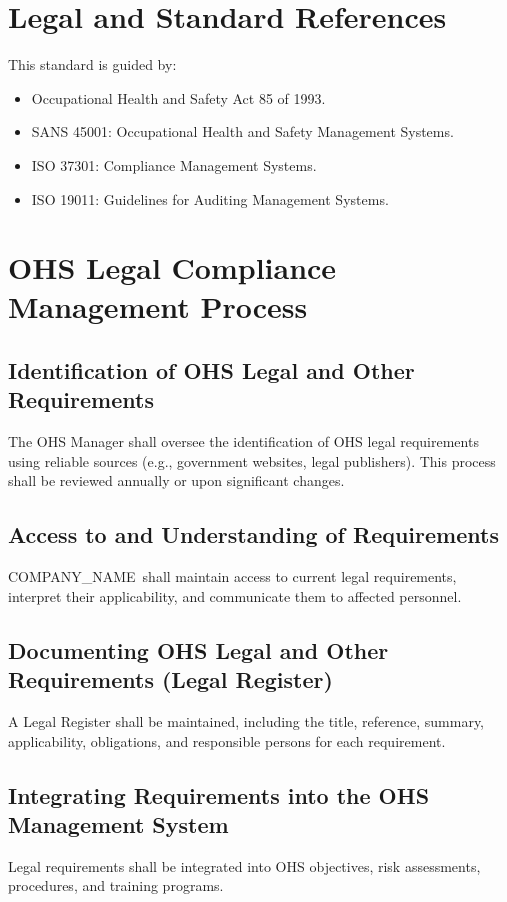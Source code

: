 \documentclass[11pt]{article}
\newcommand{\clientName}{{{COMPANY_NAME}}}
\begin{document}
\section{Legal and Standard References}
This standard is guided by:
\begin{itemize}
    \item Occupational Health and Safety Act 85 of 1993.
    \item SANS 45001: Occupational Health and Safety Management Systems.
    \item ISO 37301: Compliance Management Systems.
    \item ISO 19011: Guidelines for Auditing Management Systems.
\end{itemize}

\section{OHS Legal Compliance Management Process}

\subsection{Identification of OHS Legal and Other Requirements}
The OHS Manager shall oversee the identification of OHS legal requirements using reliable sources (e.g., government websites, legal publishers). This process shall be reviewed annually or upon significant changes.

\subsection{Access to and Understanding of Requirements}
\clientName\ shall maintain access to current legal requirements, interpret their applicability, and communicate them to affected personnel.

\subsection{Documenting OHS Legal and Other Requirements (Legal Register)}
A Legal Register shall be maintained, including the title, reference, summary, applicability, obligations, and responsible persons for each requirement.

\subsection{Integrating Requirements into the OHS Management System}
Legal requirements shall be integrated into OHS objectives, risk assessments, procedures, and training programs.
\end{document}

